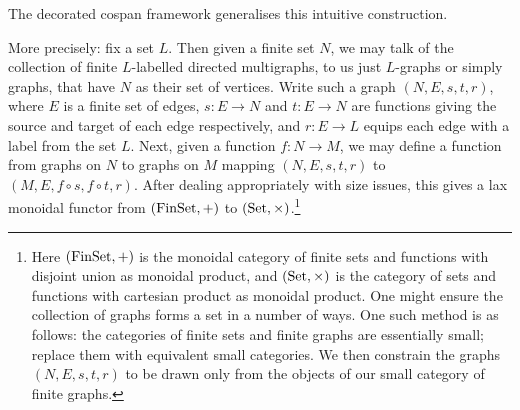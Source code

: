 \begin{center}
\end{center}
The decorated cospan framework generalises this intuitive construction.

More precisely: fix a set $L$. Then given a finite set $N$, we may talk of the
collection of finite $L$-labelled directed multigraphs, to us just $L$-graphs
or simply graphs, that have $N$ as their set of vertices. Write such a graph
$(N,E,s,t,r)$, where $E$ is a finite set of edges, $s\colon E \to N$ and $t\colon E \to N$
are functions giving the source and target of each edge respectively, and $r\colon  E
\to L$ equips each edge with a label from the set $L$.  Next, given a function
$f\colon N \to M$, we may define a function from graphs on $N$ to graphs on $M$
mapping $(N,E,s,t,r)$ to $(M,E,f \circ s,f \circ t, r)$.  After dealing
appropriately with size issues, this gives a lax monoidal functor from
$(\mathrm{FinSet},+)$ to $(\mathrm{Set},\times)$.\footnote{Here $(\mathrm{FinSet},+)$ is the monoidal
  category of finite sets and functions with disjoint union as monoidal
  product, and $(\mathrm{Set},\times)$ is the category of sets and functions with
  cartesian product as monoidal product. One might ensure the collection of
  graphs forms a set in a number of ways. One such method is as follows: the
  categories of finite sets and finite graphs are essentially small; replace
  them with equivalent small categories. We then constrain the graphs
  $(N,E,s,t,r)$ to be drawn only from the objects of our small category of finite
  graphs.}  


